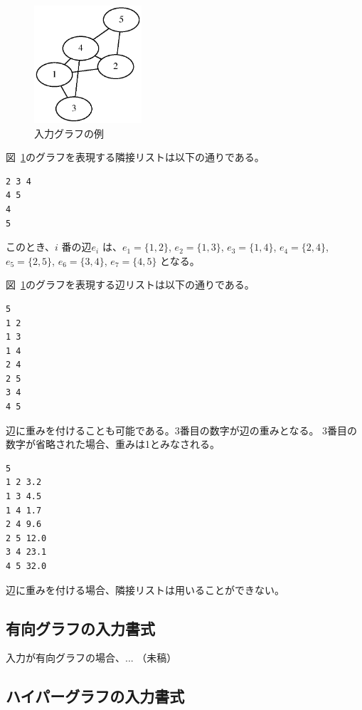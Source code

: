 \documentclass{jsarticle}
\begin{document}
\begin{figure}[h]
  \begin{center}
    \includegraphics[width=40mm]{graph_example.eps}
  \end{center}
  \caption{入力グラフの例}
  \label{fig:graph_example}
\end{figure}

図~\ref{fig:graph_example}のグラフを表現する隣接リストは以下の通りである。

\begin{verbatim}
2 3 4
4 5
4
5

\end{verbatim}

このとき、$i$ 番の辺$e_i$ は、$e_1 = \{1, 2\}$, $e_2 = \{1, 3\}$, $e_3 = \{1, 4\}$,
$e_4 = \{2, 4\}$, $e_5 = \{2, 5\}$, $e_6 = \{3, 4\}$, $e_7 = \{4, 5\}$ となる。

図~\ref{fig:graph_example}のグラフを表現する辺リストは以下の通りである。

\begin{verbatim}
5
1 2
1 3
1 4
2 4
2 5
3 4
4 5
\end{verbatim}

辺に重みを付けることも可能である。3番目の数字が辺の重みとなる。
3番目の数字が省略された場合、重みは1とみなされる。

\begin{verbatim}
5
1 2 3.2
1 3 4.5
1 4 1.7
2 4 9.6
2 5 12.0
3 4 23.1
4 5 32.0
\end{verbatim}

辺に重みを付ける場合、隣接リストは用いることができない。

\subsection{有向グラフの入力書式}

入力が有向グラフの場合、... （未稿）

\subsection{ハイパーグラフの入力書式}
\end{document}
